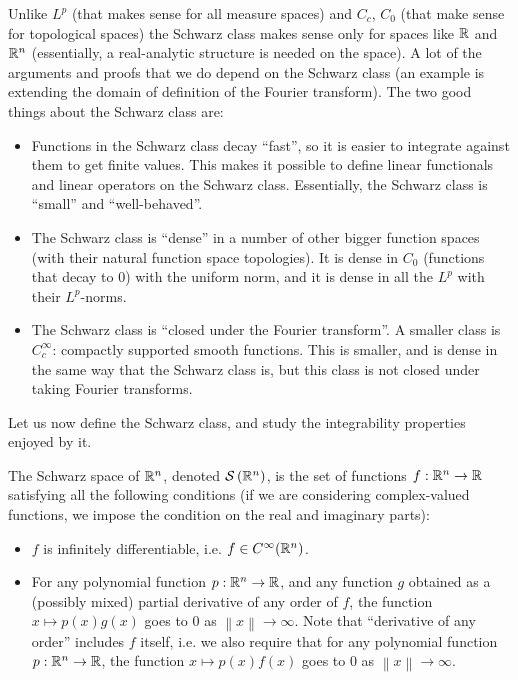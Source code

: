 \documentclass[a4paper]{amsart}
\newcommand{\norm}[1]{\left\|#1\right\|}
\newcommand{\schwarz}[1]{\mathcal{S}\left(#1\right)}
\begin{document}
Unlike $L^p$ (that makes sense for all measure spaces) and $C_c$,
$C_0$ (that make sense for topological spaces) the Schwarz class makes
sense only for spaces like $\mathbb{R}$ and $\mathbb{R}^n$ (essentially, a
real-analytic structure is needed on the space). A lot of the arguments
and proofs that we do depend on the Schwarz class (an example is
extending the domain of definition of the Fourier transform). The two
good things about the Schwarz class are:

\begin{itemize}

\item Functions in the Schwarz class decay ``fast'', so it is easier
  to integrate against them to get finite values. This makes it
  possible to define linear functionals and linear operators on the
  Schwarz class. Essentially, the Schwarz class is ``small'' and ``well-behaved''.

\item The Schwarz class is ``dense'' in a number of other bigger function
  spaces (with their natural function space topologies). It is dense
  in $C_0$ (functions that decay to $0$) with the uniform norm, and it
  is dense in all the $L^p$ with their $L^p$-norms.

\item The Schwarz class is ``closed under the Fourier transform''. A
  smaller class is $C_c^\infty$: compactly supported smooth
  functions. This is smaller, and is dense in the same way that the
  Schwarz class is, but this class is not closed under taking Fourier
  transforms.
\end{itemize}

Let us now define the Schwarz class, and study the integrability
properties enjoyed by it.

\begin{definer}
  The Schwarz space of $\mathbb{R}^n$, denoted $\schwarz{\R^n}$, is the set of
  functions $f: \mathbb{R}^n \to \mathbb{R}$ satisfying all the following conditions
  (if we are considering complex-valued functions, we impose the
  condition on the real and imaginary parts):

  \begin{itemize}

  \item $f$ is infinitely differentiable, i.e. $f \in C^\infty(\mathbb{R}^n)$.

  \item For any polynomial function $p : \mathbb{R}^n \to \mathbb{R}$, and any
    function $g$ obtained as a (possibly mixed) partial derivative of
    any order of $f$, the function $x \mapsto p(x)g(x)$ goes to $0$ as
    $\norm{x} \to \infty$. Note that ``derivative of any order''
    includes $f$ itself, i.e. we also require that for any polynomial
    function $p: \mathbb{R}^n \to \mathbb{R}$, the function $x \mapsto p(x)f(x)$ goes
    to $0$ as $\norm{x} \to \infty$.

  \end{itemize}
\end{definer}
\end{document}
